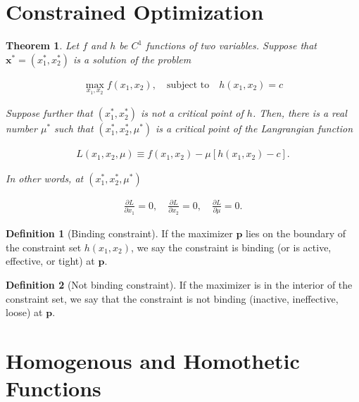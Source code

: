 \documentclass{article}
\newtheorem{theorem}{Theorem}
\theoremstyle{definition}
\newtheorem{definition}{Definition}
\theoremstyle{Solution}
\begin{document}
\section{Constrained Optimization}

\begin{theorem} Let $f$ and $h$ be $C^1$ functions of two variables. Suppose that $\textbf{x}^*=(x_1^*,x_2^*)$ is a solution of the problem

\begin{equation}
	\begin{aligned}
		\max_{x_1,x_2}f(x_1,x_2), \quad \text{subject to} \quad h(x_1,x_2)=c
	\end{aligned}
\end{equation}

Suppose further that $(x_1^*,x_2^*)$ is not a critical point of $h$. Then, there is a real number $\mu^*$ such that $(x_1^*,x_2^*,\mu^*)$ is a critical point of the Langrangian function

\begin{equation}
	\begin{aligned}
		L(x_1,x_2,\mu) \equiv f(x_1,x_2)-\mu[h(x_1,x_2)-c].
	\end{aligned}
\end{equation}

In other words, at $(x_1^*,x_2^*,\mu^*)$

\begin{equation}
	\begin{aligned}
		\frac{\partial L}{\partial x_1}=0, \quad \frac{\partial L}{\partial x_2}=0, \quad \frac{\partial L}{\partial \mu}=0.
	\end{aligned}
\end{equation}
\end{theorem}

\begin{definition}[Binding constraint]
If the maximizer $\textbf{p}$ lies on the boundary of the constraint set $h(x_1,x_2)$, we say the constraint is binding (or is active, effective, or tight) at $\textbf{p}$. 
\end{definition}

\begin{definition}[Not binding constraint] If the maximizer is in the interior of the constraint set, we say that the constraint is not binding (inactive, ineffective, loose) at $\textbf{p}$.
\end{definition}

\section{Homogenous and Homothetic Functions}
\end{document}
